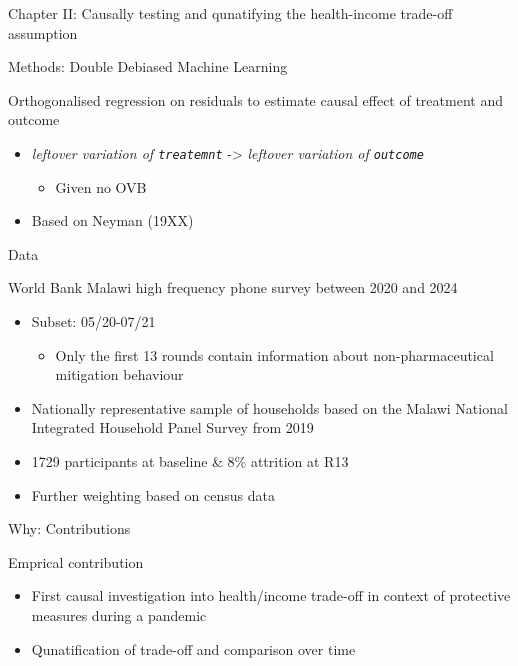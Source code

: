 \documentclass[
  ignorenonframetext,
]{beamer}
\providecommand{\tightlist}{%
  \setlength{\itemsep}{0pt}\setlength{\parskip}{0pt}}\usepackage{longtable,booktabs,array}
\begin{document}
\begin{frame}[fragile]{Chapter II: Causally testing and qunatifying the
health-income trade-off assumption}
\begin{block}{Methods: Double Debiased Machine Learning}
\begin{block}{Orthogonalised regression on residuals to estimate causal
effect of treatment and outcome}
\label{orthogonalised-regression-on-residuals-to-estimate-causal-effect-of-treatment-and-outcome}
\begin{itemize}
\tightlist
\item
  \emph{leftover variation of \texttt{treatemnt}} -\textgreater{}
  \emph{leftover variation of \texttt{outcome}}

  \begin{itemize}
  \tightlist
  \item
    Given no OVB
  \end{itemize}
\item
  Based on Neyman (19XX)
\end{itemize}
\end{block}
\end{block}

\begin{block}{Data}
\label{data-1}
\begin{block}{World Bank Malawi high frequency phone survey between 2020
and 2024}
\label{world-bank-malawi-high-frequency-phone-survey-between-2020-and-2024}
\begin{itemize}
\tightlist
\item
  Subset: 05/20-07/21

  \begin{itemize}
  \tightlist
  \item
    Only the first 13 rounds contain information about
    non-pharmaceutical mitigation behaviour
  \end{itemize}
\item
  Nationally representative sample of households based on the Malawi
  National Integrated Household Panel Survey from 2019
\item
  1729 participants at baseline \& 8\% attrition at R13
\item
  Further weighting based on census data
\end{itemize}
\end{block}
\end{block}

\begin{block}{Why: Contributions}
\label{why-contributions-1}
\begin{block}{Emprical contribution}
\label{emprical-contribution-1}
\begin{itemize}
\tightlist
\item
  First causal investigation into health/income trade-off in context of
  protective measures during a pandemic
\item
  Qunatification of trade-off and comparison over time
\end{itemize}
\end{block}


\end{block}
\end{frame}
\end{document}
